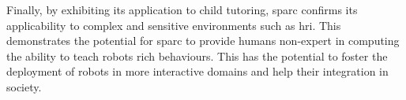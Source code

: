 Finally, by exhibiting its application to child tutoring, \gls{sparc} confirms its applicability to complex and sensitive environments such as \gls{hri}. This demonstrates the potential for \gls{sparc} to provide humans non-expert in computing the ability to teach robots rich behaviours. This has the potential to foster the deployment of robots in more interactive domains and help their integration in society.